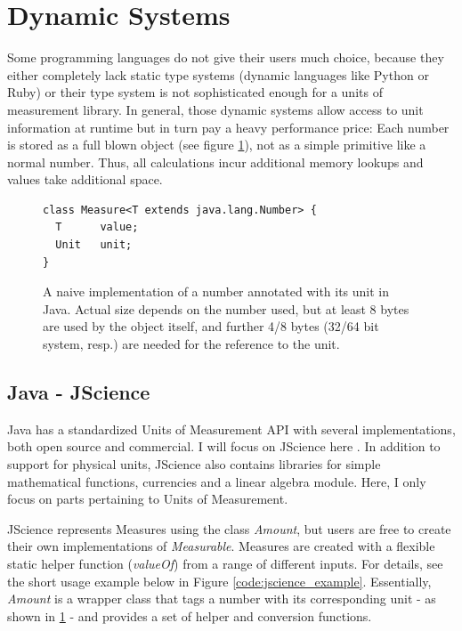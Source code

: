 \documentclass[12pt,oneside,a4paper]{scrbook}
\theoremstyle{definition}
\begin{document}
\section{Dynamic Systems}

Some programming languages do not give their users much choice, because they either completely lack static type systems (dynamic languages like Python or Ruby) or their type system is not sophisticated enough for a units of measurement library. In general, those dynamic systems allow access to unit information at runtime but in turn pay a heavy performance price: Each number is stored as a full blown object (see figure \ref{code:naive_java_measure}), not as a simple primitive like a normal number. Thus, all calculations incur additional memory lookups and values take additional space.

\begin{figure}
\begin{verbatim}
class Measure<T extends java.lang.Number> {
  T      value;
  Unit   unit;
}
\end{verbatim}
\caption{A naive implementation of a number annotated with its unit in Java. Actual size depends on the number used, but at least 8 bytes are used by the object itself, and further 4/8 bytes (32/64 bit system, resp.) are needed for the reference to the unit.}
\label{code:naive_java_measure}
\end{figure}



\subsection{Java - JScience}

Java has a standardized Units of Measurement API \citep{Units13} with several implementations, both open source and commercial. I will focus on JScience here \citep{Dautelle11}. In addition to support for physical units, JScience also contains libraries for simple mathematical functions, currencies and a linear algebra module. Here, I only focus on parts pertaining to Units of Measurement.

JScience represents Measures using the class \emph{Amount}, but users are free to create their own implementations of \emph{Measurable}. Measures are created with a flexible static helper function (\emph{valueOf}) from a range of different inputs. For details, see the short usage example below in Figure \ref{code:jscience_example}. Essentially, \emph{Amount} is a wrapper class that tags a number with its corresponding unit - as shown in \ref{code:naive_java_measure} - and provides a set of helper and conversion functions.
\end{document}
